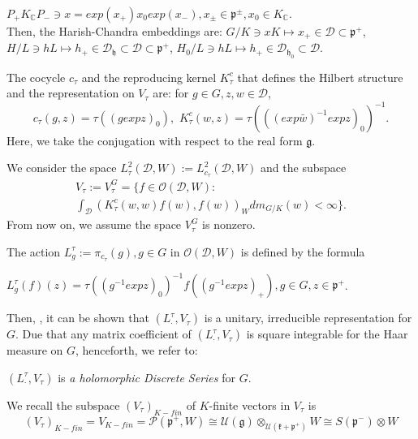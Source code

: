\documentclass[12pt]{amsart}
\theoremstyle{definition}
\theoremstyle{remark}
\numberwithin{equation}{section}
\begin{document}
 \phantom{xxxx} $P_+K_\mathbb C P_{-} \ni x=exp (x_+) x_0 exp (x_-), x_\pm \in \mathfrak p^\pm, x_0 \in K_\mathbb C$.\\ Then, the Harish-Chandra embeddings are:  $G/K \ni xK \mapsto  x_+\in \mathcal D\subset \mathfrak p^+$,   $H/L \ni hL   \mapsto  h_+\in \mathcal D_\mathfrak h \subset \mathcal D \subset  \mathfrak p^+$, $H_0/L \ni hL   \mapsto  h_+\in \mathcal D_{\mathfrak h_0} \subset \mathcal D $.

   The cocycle $c_\tau$ and the reproducing kernel $K_\tau^c$ that defines the Hilbert structure and the representation on  $V_\tau$ are:  for $g\in G, z,w \in \mathcal D$,
 \begin{equation} \label{eq:ctauktauhol} c_\tau(g,z)=\tau ((g exp z)_0),\,\, K_\tau^c (w,z)=\tau  (((exp  \bar w)^{-1}exp z)_0)^{-1}. \end{equation}
Here, we take the conjugation with respect to the real form $\mathfrak g$.


 We consider the space $L_\tau^2 (\mathcal D,W):=L_{c_\tau}^2(\mathcal D,W)$ and the subspace
 \begin{multline} \label{eq:vtau} V_\tau :=V_\tau^G= \{ f\in  \mathcal O(\mathcal D,W) : \\ \int_\mathcal D (K_\tau^c (w,w) f(w), f(w))_W dm_{G/K} (w) <\infty \}.  \end{multline}
 From now on, we assume the space $V_\tau^G$ is nonzero.

The action $L_g^\tau :=\pi_{c_\tau}(g), g\in G$ in $\mathcal O(\mathcal D,W)$ is defined    by the formula

\phantom{xxxx}$L_g^\tau(f)(z)=\tau ( (g^{-1}exp z)_0)^{-1} f( (g^{-1}exp z)_+), g\in G, z\in \mathfrak p^+$.

 Then, \cite{Neeb}, it can be shown that $(L_\cdot^\tau, V_\tau)$ is a unitary, irreducible representation for $G$. Due that any matrix coefficient of $(L_\cdot^\tau, V_\tau)$ is square integrable for the Haar measure on $G$, henceforth, we refer to:

\smallskip
 \phantom{xxxxxxx}$(L_\cdot^\tau, V_\tau)$ is {\it a holomorphic Discrete Series} for $G$.



\smallskip
 We recall    the subspace $(V_\tau)_{K-fin}$ of $K$-finite vectors in $V_\tau$ is \begin{equation}\label{eq:1} (V_\tau)_{K-fin}=V_{K-fin}=\mathcal P(\mathfrak p^+,W)  \cong \mathcal U(\mathfrak g)\otimes_{\mathcal U(\mathfrak k +\mathfrak p^+)} W \cong S(\mathfrak p^-)\otimes W \end{equation}
\end{document}
